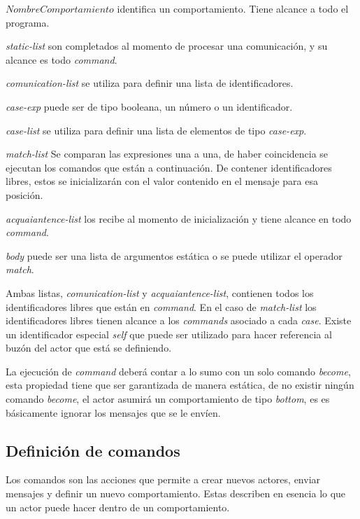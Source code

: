 \begin{description}
 \item $NombreComportamiento$ identifica un comportamiento. Tiene alcance a todo el programa. 
 \item \textit{static-list} son completados al momento de procesar una comunicación, y su alcance es todo \textit{command}. 
 \item \textit{comunication-list} se utiliza para definir una lista de identificadores.
 \item \textit{case-exp} puede ser de tipo booleana, un número o un identificador. 
 \item \textit{case-list} se utiliza para definir una lista de elementos de tipo \textit{case-exp}.
 \item \textit{match-list} Se comparan las expresiones una a una, de haber coincidencia se ejecutan los comandos que están a continuación. De contener identificadores libres, estos se inicializarán con el valor contenido en el mensaje para esa posición.
 \item \textit{acquaiantence-list} los recibe al momento de inicialización y tiene alcance en todo \textit{command}.
 \item \textit{body} puede ser una lista de argumentos estática o se puede utilizar el operador \textit{match}.
\end{description}

Ambas listas, \textit{comunication-list} y \textit{acquaiantence-list}, contienen todos los identificadores libres que están en \textit{command}. En el caso de \textit{match-list} los identificadores libres tienen alcance a los \textit{commands} asociado a cada \textit{case}. Existe un identificador especial \textit{self} que puede ser utilizado para hacer referencia al buzón del actor que está se definiendo. 

La ejecución de \textit{command} deberá contar a lo sumo con un solo comando \textit{become}, esta propiedad tiene que ser garantizada de manera estática, de no existir ningún comando \textit{become}, el actor asumirá un comportamiento de tipo \textit{bottom}, es es básicamente ignorar los mensajes que se le envíen.

\subsection{Definición de comandos}\label{actores:cmd}
Los comandos son las acciones que permite a \SAL crear nuevos actores, enviar mensajes y definir un nuevo comportamiento. Estas describen en esencia lo que un actor puede hacer dentro de un comportamiento.

